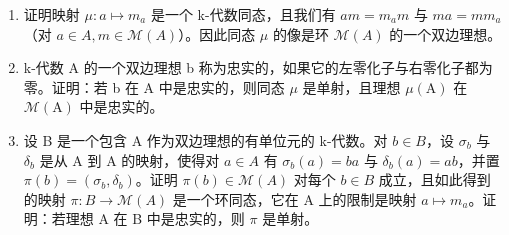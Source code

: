 \begin{enumerate}
\def\labelenumi{\alph{enumi})}
\item
  证明映射 \(\mu: a \mapsto m_{a}\) 是一个 k-代数同态，且我们有 \(am = m_{a}m\) 与 \(ma = mm_{a}\)（对 \(a \in A, m \in \mathcal{M}(A)\)）。因此同态 \(\mu\) 的像是环 \(\mathcal{M}(A)\) 的一个双边理想。
\item
  k-代数 A 的一个双边理想 b 称为忠实的，如果它的左零化子与右零化子都为零。证明：若 b 在 A 中是忠实的，则同态 \(\mu\) 是单射，且理想 \(\mu(\mathrm{A})\) 在 \(\mathcal{M}(\mathrm{A})\) 中是忠实的。
\item
  设 B 是一个包含 A 作为双边理想的有单位元的 k-代数。对 \(b \in B\)，设 \(\sigma_{b}\) 与 \(\delta_{b}\) 是从 A 到 A 的映射，使得对 \(a \in A\) 有 \(\sigma_{b}(a) = ba\) 与 \(\delta_{b}(a) = ab\)，并置 \(\pi(b) = (\sigma_{b}, \delta_{b})\)。证明 \(\pi(b) \in \mathcal{M}(A)\) 对每个 \(b \in B\) 成立，且如此得到的映射 \(\pi : B \to \mathcal{M}(A)\) 是一个环同态，它在 A 上的限制是映射 \(a \mapsto m_{a}\)。证明：若理想 A 在 B 中是忠实的，则 \(\pi\) 是单射。
\end{enumerate}

